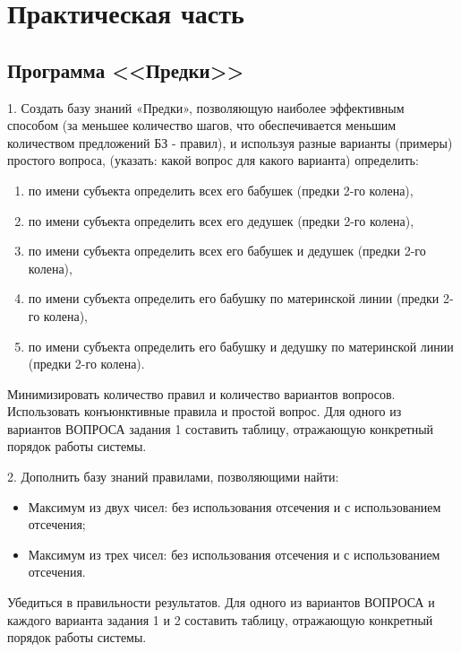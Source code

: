 \chapter{Практическая часть}

\section*{Программа <<Предки>>}
1. Создать базу знаний «Предки», позволяющую наиболее эффективным способом
(за меньшее количество шагов, что обеспечивается меньшим количеством
предложений БЗ - правил), и используя разные варианты (примеры) простого вопроса,
(указать: какой вопрос для какого варианта) определить:
\begin{enumerate}
	\item по имени субъекта определить всех его бабушек (предки 2-го колена),
	\item по имени субъекта определить всех его дедушек (предки 2-го колена),
	\item по имени субъекта определить всех его бабушек и дедушек (предки 2-го
	колена),
	\item по имени субъекта определить его бабушку по материнской линии (предки 2-го
	колена),
	\item по имени субъекта определить его бабушку и дедушку по материнской линии
	(предки 2-го колена).
\end{enumerate}
Минимизировать количество правил и количество вариантов вопросов. Использовать
конъюнктивные правила и простой вопрос. Для одного из вариантов ВОПРОСА задания 1
составить таблицу, отражающую конкретный порядок работы системы.

2. Дополнить базу знаний правилами, позволяющими найти:
\begin{itemize}
	\item Максимум из двух чисел: без использования отсечения и с использованием отсечения;
	\item Максимум из трех чисел: без использования отсечения и с использованием отсечения.
\end{itemize}

Убедиться в правильности результатов.
Для одного из вариантов ВОПРОСА и каждого варианта задания 1 и 2 составить таблицу, отражающую конкретный порядок работы системы.

\clearpage

